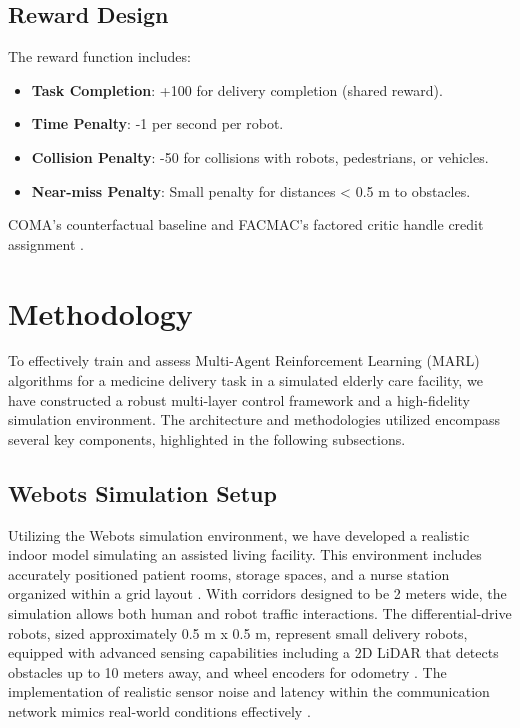 \documentclass[conference]{IEEEtran}
\begin{document}
\subsection{Reward Design}
The reward function includes:
\begin{itemize}
    \item \textbf{Task Completion}: +100 for delivery completion (shared reward).
    \item \textbf{Time Penalty}: -1 per second per robot.
    \item \textbf{Collision Penalty}: -50 for collisions with robots, pedestrians, or vehicles.
    \item \textbf{Near-miss Penalty}: Small penalty for distances < 0.5 m to obstacles.
\end{itemize}
COMA’s counterfactual baseline and FACMAC’s factored critic handle credit assignment \citep{wang2023a}.

\section{Methodology}
\label{sec:methodology}
To effectively train and assess Multi-Agent Reinforcement Learning (MARL) algorithms for a medicine delivery task in a simulated elderly care facility, we have constructed a robust multi-layer control framework and a high-fidelity simulation environment. The architecture and methodologies utilized encompass several key components, highlighted in the following subsections.

\subsection{Webots Simulation Setup}
Utilizing the Webots simulation environment, we have developed a realistic indoor model simulating an assisted living facility. This environment includes accurately positioned patient rooms, storage spaces, and a nurse station organized within a grid layout \citep{ztouni2021}. With corridors designed to be 2 meters wide, the simulation allows both human and robot traffic interactions. The differential-drive robots, sized approximately 0.5 m x 0.5 m, represent small delivery robots, equipped with advanced sensing capabilities including a 2D LiDAR that detects obstacles up to 10 meters away, and wheel encoders for odometry \citep{ztouni2021}. The implementation of realistic sensor noise and latency within the communication network mimics real-world conditions effectively \citep{ztouni2021}.
\end{document}
